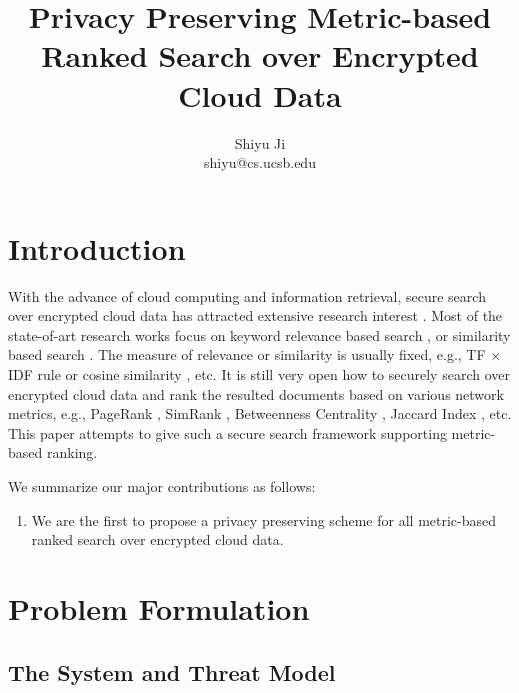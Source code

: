 \documentclass{IEEEtran}
\begin{document}
\title{\Large\bf Privacy Preserving Metric-based Ranked Search over Encrypted Cloud Data}
\author{Shiyu Ji\\ shiyu@cs.ucsb.edu}
\date{}
\maketitle

\newtheorem{definition}{Definition}
\theoremstyle{definition}
\newtheorem{theorem}{Theorem}
\theoremstyle{plain}
\newtheorem{lemma}{Lemma}
\theoremstyle{plain}
\newtheorem{corollary}{Corollary}
\theoremstyle{plain}

\section{Introduction}

With the advance of cloud computing and information retrieval, secure search over encrypted cloud data has attracted extensive research interest \cite{WC12,Cao14,Sun13,WYL14,SLH14,SLL15,LLD15,WSL15,Xia16}. Most of the state-of-art research works focus on keyword relevance based search \cite{WC12,WYL14,LLD15,SLL15,WSL15}, or similarity based search \cite{Cao14,Sun13,SLH14,Xia16}. The measure of relevance or similarity is usually fixed, e.g., TF $\times$ IDF rule \cite{WC12} or cosine similarity \cite{Cao14,Xia16}, etc. It is still very open how to securely search over encrypted cloud data and rank the resulted documents based on various network metrics, e.g., PageRank \cite{PR99}, SimRank \cite{JW02}, Betweenness Centrality \cite{Bran01}, Jaccard Index \cite{Jac89}, etc. This paper attempts to give such a secure search framework supporting metric-based ranking.

We summarize our major contributions as follows:
\begin{enumerate}
\item We are the first to propose a privacy preserving scheme for all metric-based ranked search over encrypted cloud data.
\end{enumerate}

\section{Problem Formulation}
\subsection{The System and Threat Model}
\end{document}

